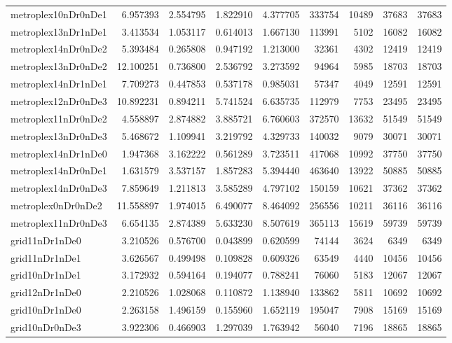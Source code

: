 \begin{longtable}{|l|r|r|r|r|r|r|r|r|}
metroplex10nDr0nDe1 & 6.957393 & 2.554795 & 1.822910 & 4.377705 & 333754 & 10489 & 37683 & 37683 \\
metroplex13nDr1nDe1 & 3.413534 & 1.053117 & 0.614013 & 1.667130 & 113991 & 5102 & 16082 & 16082 \\
metroplex14nDr0nDe2 & 5.393484 & 0.265808 & 0.947192 & 1.213000 & 32361 & 4302 & 12419 & 12419 \\
metroplex13nDr0nDe2 & 12.100251 & 0.736800 & 2.536792 & 3.273592 & 94964 & 5985 & 18703 & 18703 \\
metroplex14nDr1nDe1 & 7.709273 & 0.447853 & 0.537178 & 0.985031 & 57347 & 4049 & 12591 & 12591 \\
metroplex12nDr0nDe3 & 10.892231 & 0.894211 & 5.741524 & 6.635735 & 112979 & 7753 & 23495 & 23495 \\
metroplex11nDr0nDe2 & 4.558897 & 2.874882 & 3.885721 & 6.760603 & 372570 & 13632 & 51549 & 51549 \\
metroplex13nDr0nDe3 & 5.468672 & 1.109941 & 3.219792 & 4.329733 & 140032 & 9079 & 30071 & 30071 \\
metroplex14nDr1nDe0 & 1.947368 & 3.162222 & 0.561289 & 3.723511 & 417068 & 10992 & 37750 & 37750 \\
metroplex14nDr0nDe1 & 1.631579 & 3.537157 & 1.857283 & 5.394440 & 463640 & 13922 & 50885 & 50885 \\
metroplex14nDr0nDe3 & 7.859649 & 1.211813 & 3.585289 & 4.797102 & 150159 & 10621 & 37362 & 37362 \\
metroplex0nDr0nDe2 & 11.558897 & 1.974015 & 6.490077 & 8.464092 & 256556 & 10211 & 36116 & 36116 \\
metroplex11nDr0nDe3 & 6.654135 & 2.874389 & 5.633230 & 8.507619 & 365113 & 15619 & 59739 & 59739 \\
grid11nDr1nDe0 & 3.210526 & 0.576700 & 0.043899 & 0.620599 & 74144 & 3624 & 6349 & 6349 \\
grid11nDr1nDe1 & 3.626567 & 0.499498 & 0.109828 & 0.609326 & 63549 & 4440 & 10456 & 10456 \\
grid10nDr1nDe1 & 3.172932 & 0.594164 & 0.194077 & 0.788241 & 76060 & 5183 & 12067 & 12067 \\
grid12nDr1nDe0 & 2.210526 & 1.028068 & 0.110872 & 1.138940 & 133862 & 5811 & 10692 & 10692 \\
grid10nDr1nDe0 & 2.263158 & 1.496159 & 0.155960 & 1.652119 & 195047 & 7908 & 15169 & 15169 \\
grid10nDr0nDe3 & 3.922306 & 0.466903 & 1.297039 & 1.763942 & 56040 & 7196 & 18865 & 18865 \\

\end{longtable}
